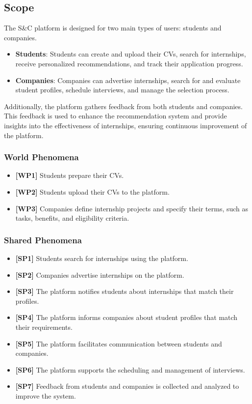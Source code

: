 \documentclass[12pt]{article}
\begin{document}
\subsection{Scope}
The S\&C platform is designed for two main types of users: students and companies. 

\begin{itemize}
    \item \textbf{Students}: Students can create and upload their CVs, search for internships, receive personalized recommendations, and track their application progress.
    \item \textbf{Companies}: Companies can advertise internships, search for and evaluate student profiles, schedule interviews, and manage the selection process.
\end{itemize}

Additionally, the platform gathers feedback from both students and companies. This feedback is used to enhance the recommendation system and provide insights into the effectiveness of internships, ensuring continuous improvement of the platform.

\subsubsection{World Phenomena}
\begin{itemize}
    \item \textbf{[WP1]} Students prepare their CVs.
    \item \textbf{[WP2]} Students upload their CVs to the platform.
    \item \textbf{[WP3]} Companies define internship projects and specify their terms, such as tasks, benefits, and eligibility criteria.
\end{itemize}

\subsubsection{Shared Phenomena}
\begin{itemize}
    \item \textbf{[SP1]} Students search for internships using the platform.
    \item \textbf{[SP2]} Companies advertise internships on the platform.
    \item \textbf{[SP3]} The platform notifies students about internships that match their profiles.
    \item \textbf{[SP4]} The platform informs companies about student profiles that match their requirements.
    \item \textbf{[SP5]} The platform facilitates communication between students and companies.
    \item \textbf{[SP6]} The platform supports the scheduling and management of interviews.
    \item \textbf{[SP7]} Feedback from students and companies is collected and analyzed to improve the system.
\end{itemize}
\end{document}
